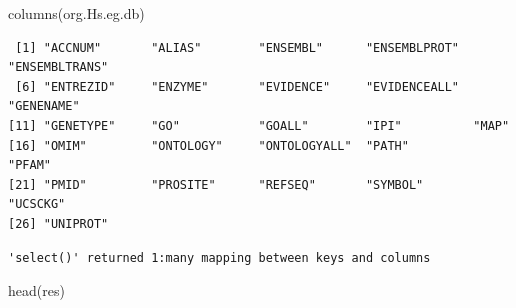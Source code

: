 \documentclass[
  letterpaper,
  DIV=11,
  numbers=noendperiod]{scrartcl}
\newenvironment{Shaded}{\begin{snugshade}}{\end{snugshade}}
\newcommand{\AttributeTok}[1]{\textcolor[rgb]{0.40,0.45,0.13}{#1}}
\newcommand{\CommentTok}[1]{\textcolor[rgb]{0.37,0.37,0.37}{#1}}
\newcommand{\FunctionTok}[1]{\textcolor[rgb]{0.28,0.35,0.67}{#1}}
\newcommand{\NormalTok}[1]{\textcolor[rgb]{0.00,0.23,0.31}{#1}}
\newcommand{\OtherTok}[1]{\textcolor[rgb]{0.00,0.23,0.31}{#1}}
\newcommand{\SpecialCharTok}[1]{\textcolor[rgb]{0.37,0.37,0.37}{#1}}
\newcommand{\StringTok}[1]{\textcolor[rgb]{0.13,0.47,0.30}{#1}}
\begin{document}
\begin{verbatim}
\end{verbatim}

\begin{Shaded}
\begin{Highlighting}[]
\FunctionTok{columns}\NormalTok{(org.Hs.eg.db)}
\end{Highlighting}
\end{Shaded}

\begin{verbatim}
 [1] "ACCNUM"       "ALIAS"        "ENSEMBL"      "ENSEMBLPROT"  "ENSEMBLTRANS"
 [6] "ENTREZID"     "ENZYME"       "EVIDENCE"     "EVIDENCEALL"  "GENENAME"    
[11] "GENETYPE"     "GO"           "GOALL"        "IPI"          "MAP"         
[16] "OMIM"         "ONTOLOGY"     "ONTOLOGYALL"  "PATH"         "PFAM"        
[21] "PMID"         "PROSITE"      "REFSEQ"       "SYMBOL"       "UCSCKG"      
[26] "UNIPROT"     
\end{verbatim}

\begin{Shaded}
\end{Shaded}

\begin{verbatim}
'select()' returned 1:many mapping between keys and columns
\end{verbatim}

\begin{Shaded}
\begin{Highlighting}[]
\FunctionTok{head}\NormalTok{(res)}
\end{Highlighting}
\end{Shaded}
\end{document}
